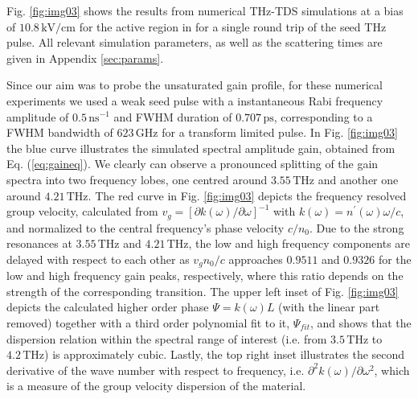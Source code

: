 \documentclass[10pt,letterpaper]{article}%
\begin{document}
Fig. \ref{fig:img03} shows the results from numerical THz-TDS simulations at a
bias of $10.8{\,}\mathrm{kV/cm}$ for the active region in
\cite{burghoff2014terahertz} for a single round trip of the seed THz
pulse\textrm{.} All relevant simulation parameters, as well as the scattering
times are given in Appendix \ref{sec:params}.

Since our aim was to probe the unsaturated gain profile, for these numerical
experiments we used a weak seed pulse with a instantaneous Rabi frequency
amplitude of $0.5{\,}\mathrm{ns}^{-1}$ and FWHM duration of $0.707{\,}%
\mathrm{ps}$, corresponding to a FWHM bandwidth of $623{\,}\mathrm{GHz}$ for a
transform limited pulse. In Fig. \ref{fig:img03} the blue curve illustrates
the simulated spectral amplitude gain, obtained from Eq. (\ref{eq:gaineq}). We
clearly can observe a pronounced splitting of the gain spectra into two
frequency lobes, one centred around $3.55{\,}\mathrm{THz}$ and another one
around $4.21{\,}\mathrm{THz}$. The red curve in Fig. \ref{fig:img03} depicts
the frequency resolved group velocity, calculated from $v_{g}=[\partial
k(\omega)/\partial\omega]^{-1}$ with $k(\omega)=n^{\prime}(\omega)\omega/c$,
and normalized to the central frequency's phase velocity\textrm{ }$c/n_{0}$.
Due to the strong resonances at $3.55{\,}\mathrm{THz}$ and $4.21{\,}%
\mathrm{THz}$, the low and high frequency components are delayed
with respect to each other as $v_{g}n_{0}/c$ approaches $0.9511$ and $0.9326$
for the low and high frequency gain peaks, respectively, where this ratio
depends on the strength of the corresponding transition. The upper left inset
of Fig. \ref{fig:img03} depicts the calculated higher order phase
$\Psi=k(\omega)L$ (with the linear part removed) together with a third order
polynomial fit to it, $\Psi_{fit}$, and shows that the dispersion relation
within the spectral range of interest (i.e. from $3.5{\,}\mathrm{THz}$ to
$4.2{\,}\mathrm{THz}$) is approximately cubic. Lastly, the top right inset
illustrates the second derivative of the wave number with respect to
frequency, i.e. $\partial^{2}k(\omega)/\partial\omega^{2}$, which is a measure
of the group velocity dispersion of the material.
\end{document}
